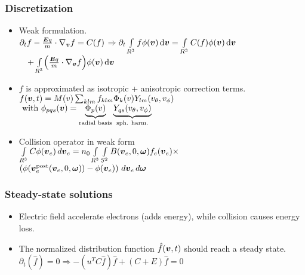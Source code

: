 \documentclass[landscape,archE,fontscale=0.285]{baposter} %
\begin{document}
\begin{poster}
{\begin{multicols}{2}
		\subsubsection*{Discretization}
		\begin{itemize}
			\item Weak formulation.\\
			$
			\partial_t f - \frac{\boldsymbol{E} q}{m} \cdot \nabla_{\boldsymbol{v}}f = C(f)$
			$
			\Rightarrow 
			\partial_t \myint_{R^3} f \phi\of{\vect{v}} \ud \vect{v} = \myint_{R^3} C(f) \phi\of{\vect{v}} \ud \vect{v}$
			$\quad + \myint_{R^3} \of{\frac{\vect{E} q}{m} \cdot \nabla_{\vect{v}} f} \phi(\vect{v}) \ud \vect{v}$
			\item $f$ is approximated as isotropic + anisotropic correction terms.\\
			$
			f(\vect{v},t) = M(v)\sum_{klm} f_{klm} \Phi_k\of{v} Y_{lm}\of{v_\theta, v_\phi}$
			$ 
			\text{ with }
			\phi_{pqs}\of{\vect{v}} = \underbrace{\Phi_p\of{v}}_{\text{radial basis}} \underbrace{Y_{qs}\of{v_\theta, v_\phi}}_{\tiny\text{sph. harm.}}$
			\item Collision operator in weak form \\
			$
			\myint_{R^3} C \phi\of{\vect{v}_e} \diff{\vect{v}_e} 
			=
			n_0 \myint_{R^3} \myint_{S^2} 
			B\of{\vect{v}_e, 0, \vect{\omega}} 
			f_e\of{\vect{v}_e} \times $ \\
			\text{\ \ \ \ \ \ \ \ \ } $
			\left(
			\phi\of{\vect{v}_e^\text{post}\of{\vect{v}_e, 0, \vect{\omega}}} 
			- \phi\of{\vect{v}_e} 
			\right)
			\diff{\vect{v}_e} \diff{\vect{\omega}}
			$
		\end{itemize}
		\subsubsection*{Steady-state solutions}
		\begin{itemize}
			\item Electric field accelerate electrons (adds energy), while collision causes energy loss.
			\item The normalized distribution function $\hat{f}\of{\vect{v},t}$ should reach a steady state.\\
			$
			\partial_t (\hat{f}) = 0 \Rightarrow -(u^T C \hat{f}) \hat{f} + (C+E)\hat{f} =0
			$%
		\end{itemize}
		\columnbreak

\end{multicols}}
\end{poster}
\end{document}
